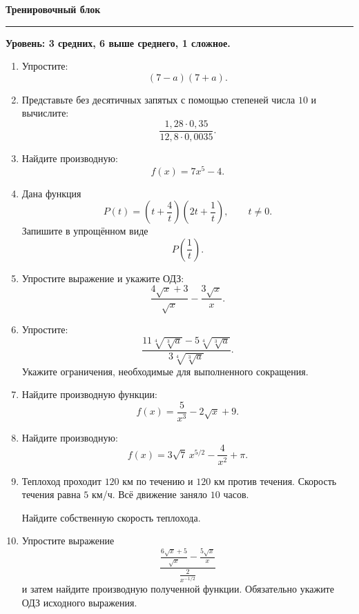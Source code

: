 \documentclass[a4paper,12pt]{article}
\newcommand{\lessonsection}[1]{%
    \vspace{0.5em}
    {\Large\bfseries\color{darkaccent}#1}\par
    \vspace{0.2em}
    {\color{accent}\rule{\linewidth}{0.6pt}}
    \vspace{0.5em}
}
\begin{document}

\clearpage
\lessonsection{Тренировочный блок}

\textbf{Уровень: 3 средних, 6 выше среднего, 1 сложное.}

\begin{enumerate}[label=\textbf{\arabic*.},leftmargin=*]

\item
Упростите:
\[
(7-a)(7+a).
\]

\item
Представьте без десятичных запятых с помощью степеней числа \(10\) и вычислите:
\[
\frac{1{,}28\cdot0{,}35}{12{,}8\cdot0{,}0035}.
\]

\item
Найдите производную:
\[
f(x)=7x^5-4.
\]

\item
Дана функция
\[
P(t)=
\left(t+\frac4t\right)
\left(2t+\frac1t\right),
\qquad t\ne0.
\]
Запишите в упрощённом виде
\[
P\left(\frac1t\right).
\]

\item
Упростите выражение и укажите ОДЗ:
\[
\frac{4\sqrt{x}+3}{\sqrt{x}}
-
\frac{3\sqrt{x}}{x}.
\]

\item
Упростите:
\[
\frac{
11\sqrt[4]{\sqrt[3]{a}}
-
5\sqrt[4]{\sqrt[3]{a}}
}{
3\sqrt[4]{\sqrt[3]{a}}
}.
\]
Укажите ограничения, необходимые для выполненного сокращения.

\item
Найдите производную функции:
\[
f(x)=
\frac5{x^3}
-
2\sqrt{x}
+
9.
\]

\item
Найдите производную:
\[
f(x)=
3\sqrt7\,x^{5/2}
-
\frac4{x^2}
+
\pi.
\]

\item
Теплоход проходит \(120\) км по течению и \(120\) км против течения. Скорость течения равна \(5\) км/ч. Всё движение заняло \(10\) часов.

Найдите собственную скорость теплохода.

\item
Упростите выражение
\[
\frac{
\displaystyle
\frac{6\sqrt{x}+5}{\sqrt{x}}
-
\frac{5\sqrt{x}}{x}
}{
\displaystyle
\frac{2}{x^{-1/2}}
}
\]
и затем найдите производную полученной функции. Обязательно укажите ОДЗ исходного выражения.

\end{enumerate}
\end{document}
